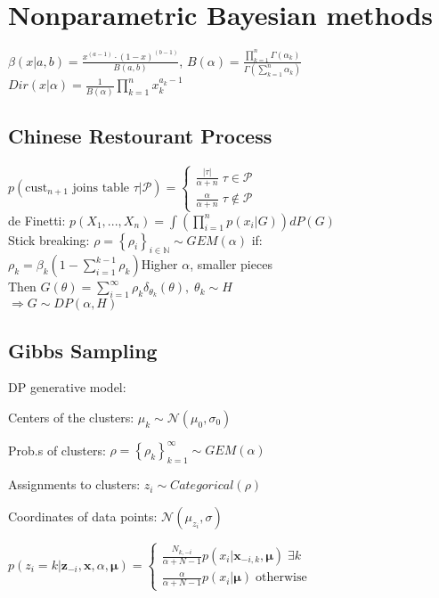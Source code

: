 \section{Nonparametric Bayesian methods}
$\beta(x|a,b) = \frac{x^{(a-1)}\cdot (1-x)^{(b-1)}}{B(a,b)}$, $B(\alpha) = \frac{\prod_{k=1}^n \Gamma(\alpha_k)}{\Gamma(\sum_{k=1}^n \alpha_k)}$
$Dir(x|\alpha) = \frac{1}{B(\alpha)} \prod_{k=1}^n x_k^{a_k - 1}$ 
\subsection*{Chinese Restourant Process}
\(
   p(\text{cust}_{n+1} \text{ joins table } \tau\vert\mathcal{P})=
   \begin{cases}
      \frac{\vert\tau\vert}{\alpha + n} \; \tau\in\mathcal{P} \\
      \frac{\alpha}{\alpha + n} \;\tau\notin\mathcal{P} 
   \end{cases}
\)\\ 
de Finetti: $p(X_1, ..., X_n) {=} \int (\prod_{i=1}^n p(x_i|G))dP(G)$ \\
Stick breaking: $\rho = \left\{\rho_i\right\}_{i \in \mathbb{N}} \sim GEM(\alpha)$ if:\\
$\rho_k = \beta_k\left(1-\sum_{i=1}^{k-1}\rho_k\right)$Higher $\alpha$, smaller pieces \\
Then $G(\theta)=\sum_{i=1}^{\infty}\rho_k \delta_{\theta_k}(\theta),\;\theta_k\sim H$\\
$\Rightarrow G\sim DP(\alpha,H)$
\subsection*{Gibbs Sampling}
DP generative model: \\
\begin{inparaitem}[\color{red}\textbullet]
\item Centers of the clusters: $\mu_k \sim \mathcal{N}(\mu_0, \sigma_0)$ \\
\item Prob.s of clusters: $\rho = \left\{\rho_k\right\}_{k=1}^\infty \sim  GEM(\alpha)$ \\
\item Assignments to clusters: $z_i \sim Categorical(\rho)$ \\
\item Coordinates of data points: $\mathcal{N}(\mu_{z_i}, \sigma)$\\
\end{inparaitem}
\(
   p(z_i=k|\bm{z}_{-i},\bm{x},\alpha,\bm{\mu}) = 
   \begin{cases}
      \frac{N_{k,-i}}{\alpha + N - 1} p(x_i|\bm{x}_{-i,k},\bm{\mu}) \;\exists k \\
      \frac{\alpha}{\alpha + N - 1} p(x_i|\bm{\mu}) \;\text{otherwise}
   \end{cases}
\)